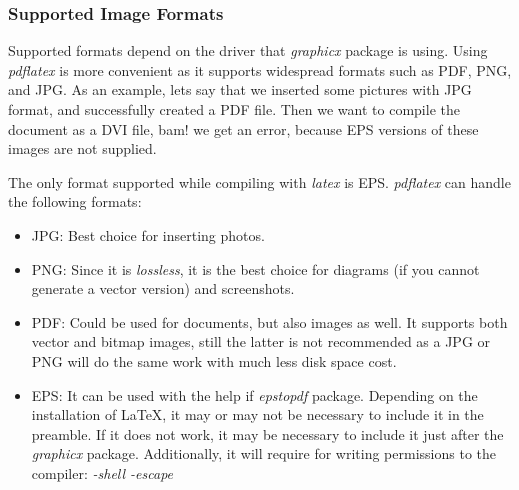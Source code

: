 \documentclass[10pt, a4paper]{article}
\begin{document}
\subsubsection{Supported Image Formats}
Supported formats depend on the driver that \emph{graphicx} package is using. Using \emph{pdflatex} is more convenient as it supports widespread formats such as PDF, PNG, and JPG. 
As an example, lets say that we inserted some pictures with JPG format, and successfully created a PDF file. Then we want to compile the document as a DVI file, bam! we get an error, because EPS versions of these images are not supplied. 

The only format supported while compiling with \emph{latex} is EPS. \emph{pdflatex} can handle the following formats:
\begin{itemize}
\item JPG: Best choice for inserting photos.
\item PNG: Since it is \textsl{lossless}, it is the best choice for diagrams (if you cannot generate a vector version) and screenshots.
\item PDF: Could be used for documents, but also images as well. It supports both vector and bitmap images, still the latter is not recommended as a JPG or PNG will do the same work with much less disk space cost. 
\item EPS: It can be used with the help if \emph{epstopdf} package. Depending on the installation of \LaTeX, it may or may not be necessary to include it in the preamble. If it does not work, it may be necessary to include it just after the \emph{graphicx} package. Additionally, it will require for writing permissions to the compiler: \textsl{-shell -escape}
\end{itemize}
\end{document}
